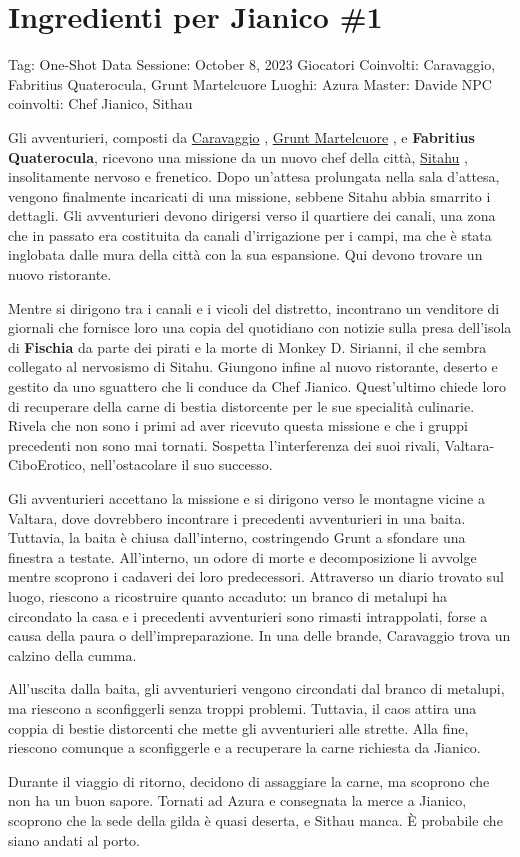 \section{Ingredienti per Jianico \#1}\label{ingredienti-per-jianico-1}

Tag: One-Shot Data Sessione: October 8, 2023 Giocatori Coinvolti:
Caravaggio, Fabritius Quaterocula, Grunt Martelcuore Luoghi: Azura
Master: Davide NPC coinvolti: Chef Jianico, Sithau

Gli avventurieri, composti da
\href{Caravaggio\%20085126a6bfcc4e48a2f654c751f29d4d.md}{Caravaggio} ,
\href{Grunt\%20Martelcuore\%20904d4cbd76ee43c29753bdefdc19d019.md}{Grunt
Martelcuore} , e \textbf{Fabritius Quaterocula}, ricevono una missione
da un nuovo chef della città,
\href{Sitahu\%203e1abded771c4c39a375ae0243478a44.md}{Sitahu} ,
insolitamente nervoso e frenetico. Dopo un'attesa prolungata nella sala
d'attesa, vengono finalmente incaricati di una missione, sebbene Sitahu
abbia smarrito i dettagli. Gli avventurieri devono dirigersi verso il
quartiere dei canali, una zona che in passato era costituita da canali
d'irrigazione per i campi, ma che è stata inglobata dalle mura della
città con la sua espansione. Qui devono trovare un nuovo ristorante.

Mentre si dirigono tra i canali e i vicoli del distretto, incontrano un
venditore di giornali che fornisce loro una copia del quotidiano con
notizie sulla presa dell'isola di \textbf{Fischia} da parte dei pirati e
la morte di Monkey D. Sirianni, il che sembra collegato al nervosismo di
Sitahu. Giungono infine al nuovo ristorante, deserto e gestito da uno
sguattero che li conduce da Chef Jianico. Quest'ultimo chiede loro di
recuperare della carne di bestia distorcente per le sue specialità
culinarie. Rivela che non sono i primi ad aver ricevuto questa missione
e che i gruppi precedenti non sono mai tornati. Sospetta l'interferenza
dei suoi rivali, Valtara-CiboErotico, nell'ostacolare il suo successo.

Gli avventurieri accettano la missione e si dirigono verso le montagne
vicine a Valtara, dove dovrebbero incontrare i precedenti avventurieri
in una baita. Tuttavia, la baita è chiusa dall'interno, costringendo
Grunt a sfondare una finestra a testate. All'interno, un odore di morte
e decomposizione li avvolge mentre scoprono i cadaveri dei loro
predecessori. Attraverso un diario trovato sul luogo, riescono a
ricostruire quanto accaduto: un branco di metalupi ha circondato la casa
e i precedenti avventurieri sono rimasti intrappolati, forse a causa
della paura o dell'impreparazione. In una delle brande, Caravaggio trova
un calzino della cumma.

All'uscita dalla baita, gli avventurieri vengono circondati dal branco
di metalupi, ma riescono a sconfiggerli senza troppi problemi. Tuttavia,
il caos attira una coppia di bestie distorcenti che mette gli
avventurieri alle strette. Alla fine, riescono comunque a sconfiggerle e
a recuperare la carne richiesta da Jianico.

Durante il viaggio di ritorno, decidono di assaggiare la carne, ma
scoprono che non ha un buon sapore. Tornati ad Azura e consegnata la
merce a Jianico, scoprono che la sede della gilda è quasi deserta, e
Sithau manca. È probabile che siano andati al porto.
